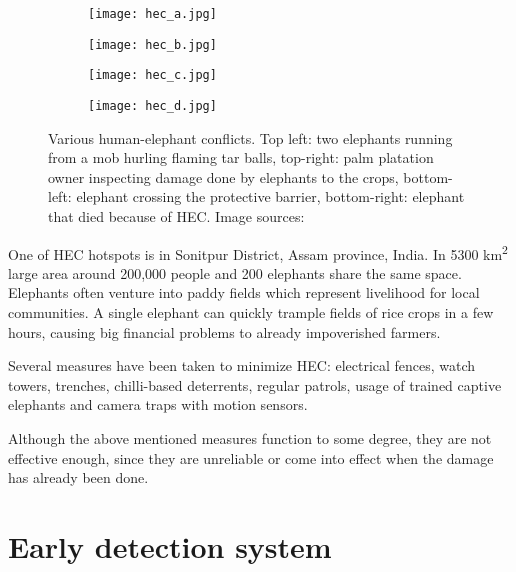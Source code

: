 \begin{figure}[ht]
    \begin{subfigure}{0.5\textwidth}
        \centering
        \texttt{[image: hec\_a.jpg]} 
    \end{subfigure}
    \begin{subfigure}{0.5\textwidth}
        \centering
        \texttt{[image: hec\_b.jpg]} 
    \end{subfigure}
    \begin{subfigure}{0.5\textwidth}
        \centering
        \texttt{[image: hec\_c.jpg]} 
    \end{subfigure}
    \begin{subfigure}{0.5\textwidth}
        \centering
        \texttt{[image: hec\_d.jpg]} 
    \end{subfigure}
\caption[Various human-elephant conflicts.] {Various human-elephant conflicts. Top left: two elephants running from a mob hurling flaming tar balls, top-right: palm platation owner inspecting damage done by elephants to the crops, bottom-left: elephant crossing the protective barrier, bottom-right: elephant that died because of HEC. Image sources:\cite{wildlabs-elephants}\cite{econe_image}\cite{save_our_species_image}\cite{the_week_image}}
    \label{various_hec}
\end{figure}

One of HEC hotspots is in Sonitpur District, Assam province, India. 
In 5300 km\textsuperscript{2} large area around 200,000 people and 200 elephants share the same space\cite{wildlabs-elephants}.
Elephants often venture into paddy fields which represent livelihood for local communities.
A single elephant can quickly trample fields of rice crops in a few hours, causing big financial problems to already impoverished farmers\cite{wildlabs-elephants}.

Several measures have been taken to minimize HEC: electrical fences, watch towers, trenches, chilli-based deterrents, regular patrols, usage of trained captive elephants and camera traps with motion sensors.

Although the above mentioned measures function to some degree, they are not effective enough, since they are unreliable or come into effect when the damage has already been done\cite{wildlabs}. 

\section{ Early detection system}\label{early_detection_system}

